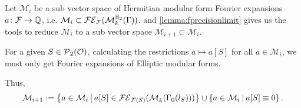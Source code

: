 \begin{remark}
\label{remark:algo-mainstep1}
Let $\mathcal{M}_i$ be a sub vector space of Hermitian modular form Fourier expansions $a \colon \mathcal{F} \rightarrow \mathbb{Q}$, i.e. $\mathcal{M}_i \subset \mathcal{FE}_{\mathcal{F}}(\operatorname{\mathcal{M}}^{\mathbb{H}_{2}}_k (\Gamma))$.
 and \cref{lemma:fprecisionlimit} gives us the tools to reduce $\mathcal{M}_i$ to a sub vector space $\mathcal{M}_{i+1} \subset \mathcal{M}_i$.

For a given $S \in \operatorname{\mathcal{P}}_2(\mathcal{O})$, calculating the restrictions $a \mapsto a[S]$ for all $a \in \mathcal{M}_i$, we must only get Fourier expansions of Elliptic modular forms.

Thus,
\[  \mathcal{M}_{i+1} := \Set{a \in \mathcal{M}_i}{a[S] \in \FE_{\F(S)}(\ESpace{k}{\Gamma_0(l_S)})} \cup \Set{a \in \mathcal{M}_i}{a[S] \equiv 0}. \]
\end{remark}

